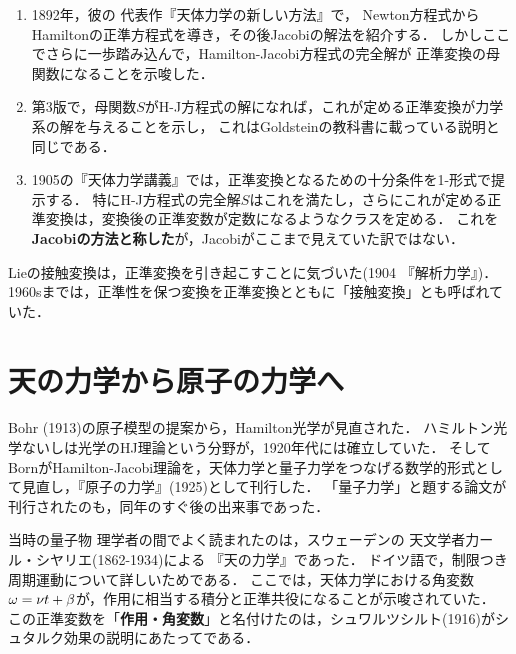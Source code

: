\documentclass[uplatex, dvipdfmx]{jsreport}
\begin{document}
\begin{history}[Poincareの正準変換の研究]\mbox{}
    \begin{enumerate}
        \item 1892年，彼の
        代表作『天体力学の新しい方法』\cite{Poincare1892}で，
        Newton方程式からHamiltonの正準方程式を導き，その後Jacobiの解法を紹介する．
        しかしここでさらに一歩踏み込んで，Hamilton-Jacobi方程式の完全解が
        正準変換の母関数になることを示唆した．
        \item 第3版で，母関数$S$がH-J方程式の解になれば，これが定める正準変換が力学系の解を与えることを示し，
        これはGoldsteinの教科書に載っている説明と同じである．
        \item 1905の『天体力学講義』\cite{Poincare1905}では，正準変換となるための十分条件を1-形式で提示する．
        特にH-J方程式の完全解$S$はこれを満たし，さらにこれが定める正準変換は，変換後の正準変数が定数になるようなクラスを定める．
        これを\textbf{Jacobiの方法と称した}が，Jacobiがここまで見えていた訳ではない．
    \end{enumerate}
\end{history}

\begin{history}
    Lieの接触変換は，正準変換を引き起こすことに気づいた(1904 『解析力学』)．
    1960sまでは，正準性を保つ変換を正準変換とともに「接触変換」とも呼ばれていた．
\end{history}

\section{天の力学から原子の力学へ}

\begin{tcolorbox}[colframe=ForestGreen, colback=ForestGreen!10!white,breakable,colbacktitle=ForestGreen!40!white,coltitle=black,fonttitle=\bfseries\sffamily,
title=]
    Bohr (1913)の原子模型の提案から，Hamilton光学が見直された．
    ハミルトン光学ないしは光学のHJ理論という分野が，1920年代には確立していた．
    そしてBornがHamilton-Jacobi理論を，天体力学と量子力学をつなげる数学的形式として見直し，『原子の力学』(1925)として刊行した．
    「量子力学」と題する論文が刊行されたのも，同年のすぐ後の出来事であった．
\end{tcolorbox}

\begin{history}
    当時の量子物
理学者の間でよく読まれたのは，スウェーデンの
天文学者力ール・シヤリエ(1862-1934)による
『天の力学』であった．
ドイツ語で，制限つき周期運動について詳しいためである．
ここでは，天体力学における角変数$\omega=\nu t+\beta$が，作用に相当する積分と正準共役になることが示唆されていた．
この正準変数を「\textbf{作用・角変数}」と名付けたのは，シュワルツシルト(1916)がシュタルク効果の説明にあたってである．
\end{history}
\end{document}
